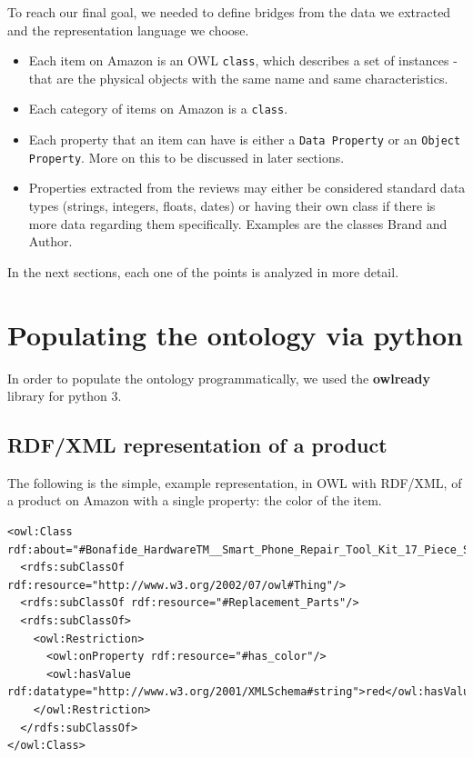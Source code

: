 \documentclass[LaM,oneside,binding=0.6cm]{sapthesis}
\begin{document}
To reach our final goal, we needed to define bridges from the data we extracted and the representation language we choose. \\

\begin{itemize}
\item Each item on Amazon is an OWL \texttt{class}, which describes a set of instances - that are the physical objects with the same name and same characteristics.
\item Each category of items on Amazon is a \texttt{class}.
\item Each property that an item can have is either a \texttt{Data Property} or an \texttt{Object Property}. More on this to be discussed in later sections.
\item Properties extracted from the reviews may either be considered standard data types (strings, integers, floats, dates) or having their own class if there is more data regarding them specifically. Examples are the classes Brand and Author.
\end{itemize}

In the next sections, each one of the points is analyzed in more detail.

\section{Populating the ontology via python}

In order to populate the ontology programmatically, we used the \textbf{owlready} library for python 3. 

\subsection{RDF/XML representation of a product}

The following is the simple, example representation, in OWL with RDF/XML, of a product on Amazon with a single property: the color of the item.

\bigskip

\begin{lstlisting}[language=owl]
<owl:Class rdf:about="#Bonafide_HardwareTM__Smart_Phone_Repair_Tool_Kit_17_Piece_Set_Screw_Driver_Torx_Pentalobe_Cell_Tools">
  <rdfs:subClassOf rdf:resource="http://www.w3.org/2002/07/owl#Thing"/>
  <rdfs:subClassOf rdf:resource="#Replacement_Parts"/>
  <rdfs:subClassOf>
    <owl:Restriction>
      <owl:onProperty rdf:resource="#has_color"/>
      <owl:hasValue rdf:datatype="http://www.w3.org/2001/XMLSchema#string">red</owl:hasValue>
    </owl:Restriction>
  </rdfs:subClassOf>
</owl:Class>
\end{lstlisting}
\end{document}
